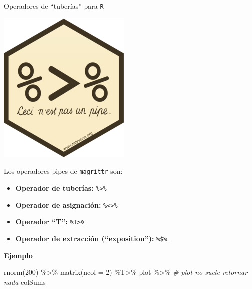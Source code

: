 \documentclass[
  ignorenonframetext,
  aspectratio=169]{beamer}
\newenvironment{Shaded}{\begin{snugshade}}{\end{snugshade}}
\newcommand{\AttributeTok}[1]{\textcolor[rgb]{0.77,0.63,0.00}{#1}}
\newcommand{\CommentTok}[1]{\textcolor[rgb]{0.56,0.35,0.01}{\textit{#1}}}
\newcommand{\DecValTok}[1]{\textcolor[rgb]{0.00,0.00,0.81}{#1}}
\newcommand{\FunctionTok}[1]{\textcolor[rgb]{0.00,0.00,0.00}{#1}}
\newcommand{\NormalTok}[1]{#1}
\newcommand{\SpecialCharTok}[1]{\textcolor[rgb]{0.00,0.00,0.00}{#1}}
\providecommand{\tightlist}{%
  \setlength{\itemsep}{0pt}\setlength{\parskip}{0pt}}
\begin{document}
\begin{frame}[fragile]{Operadores de ``tuberías'' para \texttt{R}}
\protect\hypertarget{operadores-de-tuberuxedas-para-r}{}
\begin{flushright}\includegraphics[width=0.05\linewidth]{Imgs/logo_pipe} \end{flushright}

Los operadores pipes de \texttt{magrittr} son:

\begin{itemize}
\tightlist
\item
  \textbf{Operador de tuberías:} \texttt{\%\textgreater{}\%}
\item
  \textbf{Operador de asignación:}
  \texttt{\%\textless{}\textgreater{}\%}
\item
  \textbf{Operador ``T'':} \texttt{\%T\textgreater{}\%}
\item
  \textbf{Operador de extracción (``exposition''):} \texttt{\%\$\%}.
\end{itemize}

\textbf{Ejemplo}

\begin{Shaded}
\begin{Highlighting}[]
\FunctionTok{rnorm}\NormalTok{(}\DecValTok{200}\NormalTok{) }\SpecialCharTok{\%\textgreater{}\%}
\FunctionTok{matrix}\NormalTok{(}\AttributeTok{ncol =} \DecValTok{2}\NormalTok{) }\SpecialCharTok{\%T\textgreater{}\%}
\NormalTok{plot }\SpecialCharTok{\%\textgreater{}\%} \CommentTok{\# plot no suele retornar nada}
\NormalTok{colSums}
\end{Highlighting}
\end{Shaded}
\end{frame}
\end{document}
